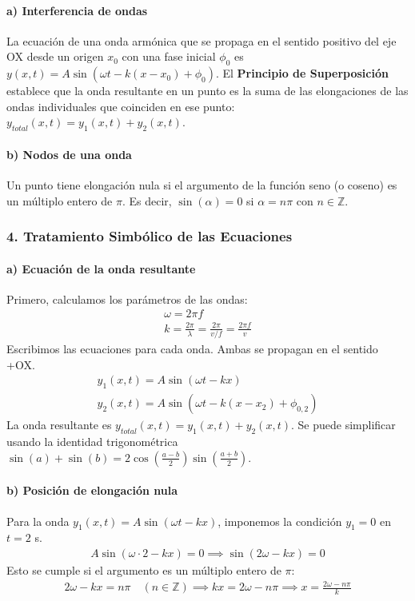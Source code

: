 \paragraph*{a) Interferencia de ondas}
La ecuación de una onda armónica que se propaga en el sentido positivo del eje OX desde un origen $x_0$ con una fase inicial $\phi_0$ es $y(x,t) = A\sin(\omega t - k(x-x_0) + \phi_0)$. El \textbf{Principio de Superposición} establece que la onda resultante en un punto es la suma de las elongaciones de las ondas individuales que coinciden en ese punto: $y_{total}(x,t) = y_1(x,t) + y_2(x,t)$.

\paragraph*{b) Nodos de una onda}
Un punto tiene elongación nula si el argumento de la función seno (o coseno) es un múltiplo entero de $\pi$. Es decir, $\sin(\alpha)=0$ si $\alpha=n\pi$ con $n \in \mathbb{Z}$.

\subsubsection*{4. Tratamiento Simbólico de las Ecuaciones}
\paragraph*{a) Ecuación de la onda resultante}
Primero, calculamos los parámetros de las ondas:
\begin{gather}
    \omega = 2\pi f \\
    k = \frac{2\pi}{\lambda} = \frac{2\pi}{v/f} = \frac{2\pi f}{v}
\end{gather}
Escribimos las ecuaciones para cada onda. Ambas se propagan en el sentido +OX.
\begin{gather}
    y_1(x,t) = A\sin(\omega t - kx) \\
    y_2(x,t) = A\sin(\omega t - k(x-x_2) + \phi_{0,2})
\end{gather}
La onda resultante es $y_{total}(x,t) = y_1(x,t) + y_2(x,t)$. Se puede simplificar usando la identidad trigonométrica $\sin(a) + \sin(b) = 2\cos\left(\frac{a-b}{2}\right)\sin\left(\frac{a+b}{2}\right)$.

\paragraph*{b) Posición de elongación nula}
Para la onda $y_1(x,t) = A\sin(\omega t - kx)$, imponemos la condición $y_1=0$ en $t=2$ s.
\begin{gather}
    A\sin(\omega \cdot 2 - kx) = 0 \implies \sin(2\omega - kx) = 0
\end{gather}
Esto se cumple si el argumento es un múltiplo entero de $\pi$:
\begin{gather}
    2\omega - kx = n\pi \quad (n \in \mathbb{Z}) \implies kx = 2\omega - n\pi \implies x = \frac{2\omega - n\pi}{k}
\end{gather}

